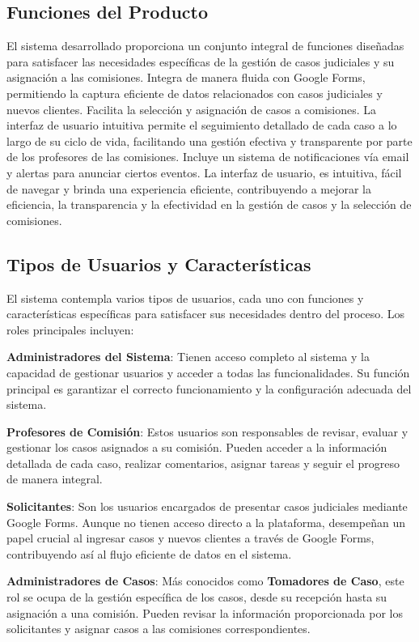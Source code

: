 \subsection{Funciones del Producto}
El sistema desarrollado proporciona un conjunto integral de funciones diseñadas para satisfacer las necesidades específicas de la gestión de casos judiciales y su asignación a las comisiones. Integra de manera fluida con Google Forms, permitiendo la captura eficiente de datos relacionados con casos judiciales y nuevos clientes. Facilita la selección y asignación de casos a comisiones. La interfaz de usuario intuitiva permite el seguimiento detallado de cada caso a lo largo de su ciclo de vida, facilitando una gestión efectiva y transparente por parte de los profesores de las comisiones. Incluye un sistema de notificaciones vía email y alertas para anunciar ciertos eventos. La interfaz de usuario, es intuitiva, fácil de navegar y brinda una experiencia eficiente, contribuyendo a mejorar la eficiencia, la transparencia y la efectividad en la gestión de casos y la selección de comisiones.

\subsection{Tipos de Usuarios y Características}
El sistema contempla varios tipos de usuarios, cada uno con funciones y características específicas para satisfacer sus necesidades dentro del proceso. Los roles principales incluyen:

\textbf{Administradores del Sistema}: Tienen acceso completo al sistema y la capacidad de gestionar usuarios y acceder a todas las funcionalidades. Su función principal es garantizar el correcto funcionamiento y la configuración adecuada del sistema.

\textbf{Profesores de Comisión}: Estos usuarios son responsables de revisar, evaluar y gestionar los casos asignados a su comisión. Pueden acceder a la información detallada de cada caso, realizar comentarios, asignar tareas y seguir el progreso de manera integral.

\textbf{Solicitantes}: Son los usuarios encargados de presentar casos judiciales mediante Google Forms. Aunque no tienen acceso directo a la plataforma, desempeñan un papel crucial al ingresar casos y nuevos clientes a través de Google Forms, contribuyendo así al flujo eficiente de datos en el sistema.

\textbf{Administradores de Casos}: Más conocidos como \textbf{Tomadores de Caso}, este rol se ocupa de la gestión específica de los casos, desde su recepción hasta su asignación a una comisión. Pueden revisar la información proporcionada por los solicitantes y asignar casos a las comisiones correspondientes.




